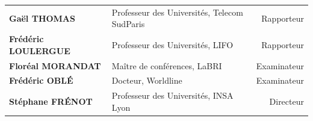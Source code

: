\begin{center}
\begin{tabu} {l X[l] r}
\textbf{Gaël \MakeUppercase{Thomas}}         & Professeur des Universités, Telecom SudParis & {\color{RED} Rapporteur}\\
\textbf{Frédéric \MakeUppercase{Loulergue}~} & Professeur des Universités, LIFO             & {\color{RED} Rapporteur}\\
\textbf{Floréal \MakeUppercase{Morandat}}    & Maître de conférences, LaBRI                 & {\color{RED} Examinateur}\\
\textbf{Frédéric \MakeUppercase{Oblé}}       & Docteur, Worldline                           & {\color{RED} Examinateur}\\
\textbf{Stéphane \MakeUppercase{Frénot}}     & Professeur des Universités, INSA Lyon       & {\color{RED} Directeur}\\
\end{tabu}
\end{center}
\restoregeometry
\eject